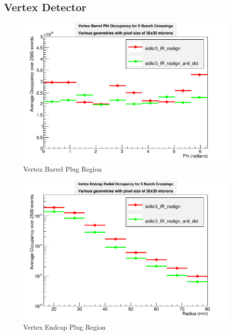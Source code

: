 \documentclass{report}
\begin{document}
            \subsection{Vertex Detector}
                \begin{figure}[H] 
                    \includegraphics[width=\textwidth]{VradOccupancy_base_brl}
                    \centering
                    \caption{Vertex Barrel Plug Region}
                    \label{fig:did_vertex_brl}
                \end{figure}
                \begin{figure}[H] 
                    \includegraphics[width=\textwidth]{VradOccupancy_base_ecp}
                    \centering
                    \caption{Vertex Endcap Plug Region}
                    \label{fig:did_vertex_ecp}
                \end{figure}
\end{document}
